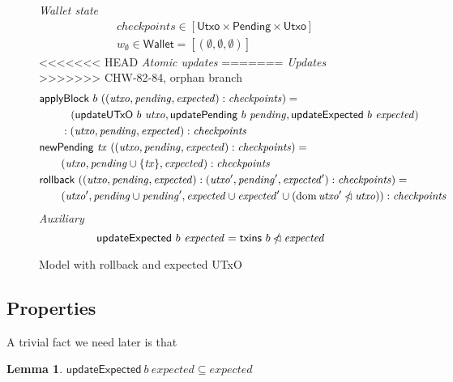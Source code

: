 \documentclass{article}
\newcommand{\restrictdom}{\lhd}
\newcommand{\subtractdom}{\mathbin{\slashed{\restrictdom}}}
\DeclareMathOperator{\dom}{dom}
\theoremstyle{definition}{
  \newtheorem{lemma}{Lemma}[section] %
  \newtheorem{definition}[lemma]{Definition}
}
\theoremstyle{theorem}{
  \newtheorem{invariant}[lemma]{Invariant}
  \newtheorem{proofobligation}[lemma]{Proof Obligation}
}
\newtheorem{lemma}{Lemma}[section] %
\numberwithin{equation}{lemma}
\begin{document}
\begin{figure}
%
\emph{Wallet state}
%
\begin{align*}
& \mathit{checkpoints} \in [\mathsf{Utxo} \times \mathsf{Pending} \times \mathsf{Utxo}] \\
& w_\emptyset \in \mathsf{Wallet} = [(\emptyset, \emptyset, \emptyset)]
\end{align*}
%
<<<<<<< HEAD
\emph{Atomic updates}
=======
\emph{Updates}
>>>>>>> CHW-82-84, orphan branch
%
\begin{align*}
& \mathsf{applyBlock} ~ b ~ ((\mathit{utxo}, \mathit{pending}, \mathit{expected}) : \mathit{checkpoints}) = \\
& \qquad \phantom{:{}} ~ (\mathsf{updateUTxO} ~ b ~ \mathit{utxo}, \mathsf{updatePending} ~ b ~ \mathit{pending}, \mathsf{updateExpected} ~ b ~ \mathit{expected}) \\
& \qquad : (\mathit{utxo}, \mathit{pending}, \mathit{expected}) : \mathit{checkpoints} \\
& \mathsf{newPending} ~ \mathit{tx} ~ ((\mathit{utxo}, \mathit{pending}, \mathit{expected}) : \mathit{checkpoints}) = \\
& \qquad (\mathit{utxo}, \mathit{pending} \cup \{\mathit{tx}\}, \mathit{expected}) : \mathit{checkpoints} \\
& \mathsf{rollback} ~ ((\mathit{utxo}, \mathit{pending}, \mathit{expected}) : (\mathit{utxo}', \mathit{pending}', \mathit{expected}') : \mathit{checkpoints}) = \\
& \qquad (\mathit{utxo}', \mathit{pending} \cup \mathit{pending}', \mathit{expected} \cup \mathit{expected}' \cup (\dom \mathit{utxo}' \subtractdom \mathit{utxo})) : \mathit{checkpoints} \\
\end{align*}
%
\emph{Auxiliary}
%
\begin{equation*}
\mathsf{updateExpected} ~ b ~ \mathit{expected} = \mathsf{txins} ~ b \subtractdom \mathit{expected}
\end{equation*}
%
\caption{\label{fig:model_with_expected_UTxO}Model with rollback and expected UTxO}
\end{figure}

\subsection{Properties}

A trivial fact we need later is that
%
\begin{lemma} \label{lem:updateExpected_is_filter}
\begin{math}
\mathsf{updateExpected} ~ b ~ \mathit{expected} \subseteq \mathit{expected}
\end{math}
\end{lemma}
\end{document}
